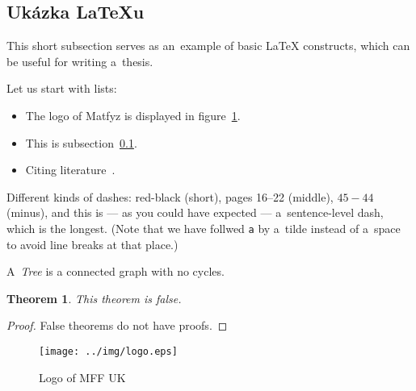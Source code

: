 
\subsection{Ukázka \LaTeX{}u}
\label{ssec:ukazka}

This short subsection serves as an~example of basic \LaTeX{} constructs,
which can be useful for writing a~thesis.

Let us start with lists:

\begin{itemize}
\item The logo of Matfyz is displayed in figure~\ref{fig:mff}.
\item This is subsection~\ref{ssec:ukazka}.
\item Citing literature~\cite{lamport94}.
\end{itemize}

Different kinds of dashes:
red-black (short),
pages 16--22 (middle),
$45-44$ (minus),
and this is --- as you could have expected --- a~sentence-level dash,
which is the longest.
(Note that we have follwed \verb|a| by a~tilde instead of a~space
to avoid line breaks at that place.)

\newtheorem{theorem}{Theorem}

\begin{define}
A~{\sl Tree} is a connected graph with no cycles.
\end{define}

\begin{theorem}
This theorem is false.
\end{theorem}

\begin{proof}
False theorems do not have proofs.
\end{proof}

\begin{figure}
	\centering
	\texttt{[image: ../img/logo.eps]}
	\caption{Logo of MFF UK}
	\label{fig:mff}
\end{figure}
